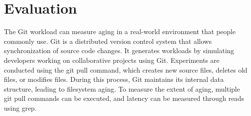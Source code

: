 \section{Evaluation}
\label{s:eval}




The Git workload\cite{conway2017fragment} can measure aging in a real-world environment that people commonly use.
Git is a distributed version control system that allows synchronization of source code changes.
It generates workloads by simulating developers working on collaborative projects using Git.
Experiments are conducted using the git pull command, which creates new source files, deletes old files, or modifies files. During this process, Git maintains its internal data structure, leading to filesystem aging.
To measure the extent of aging, multiple git pull commands can be executed, and latency can be measured through reads using grep.

